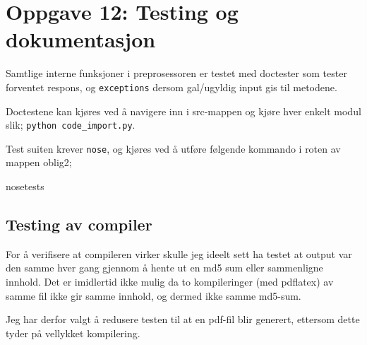 \section*{Oppgave 12: Testing og dokumentasjon}

Samtlige interne funksjoner i preprosessoren er testet med doctester som tester forventet respons, og \verb;exceptions; dersom gal/ugyldig input gis til metodene.

Doctestene kan kjøres ved å navigere inn i src-mappen og kjøre hver enkelt modul slik; \verb;python code_import.py;.

Test suiten krever \verb;nose;, og kjøres ved å utføre følgende kommando i roten av mappen oblig2;

nosetests

\subsection*{Testing av compiler}
For å verifisere at compileren virker skulle jeg ideelt sett ha testet at output var den samme hver gang gjennom å hente ut en md5 sum eller sammenligne innhold. Det er imidlertid ikke mulig da to kompileringer (med pdflatex) av samme fil ikke gir samme innhold, og dermed ikke samme md5-sum.

Jeg har derfor valgt å redusere testen til at en pdf-fil blir generert, ettersom dette tyder på vellykket kompilering.